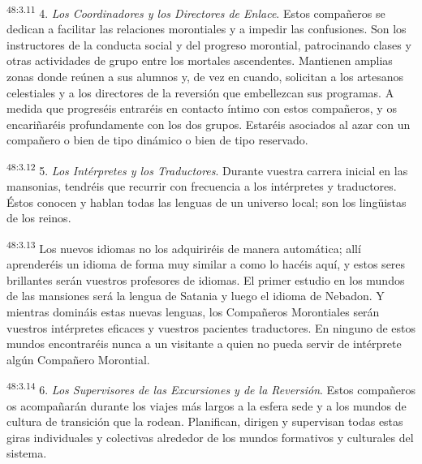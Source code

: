 \par
\textsuperscript{48:3.11} 4. \textit{Los Coordinadores y los Directores de Enlace}. Estos compañeros se dedican a facilitar las relaciones morontiales y a impedir las confusiones. Son los instructores de la conducta social y del progreso morontial, patrocinando clases y otras actividades de grupo entre los mortales ascendentes. Mantienen amplias zonas donde reúnen a sus alumnos y, de vez en cuando, solicitan a los artesanos celestiales y a los directores de la reversión que embellezcan sus programas. A medida que progreséis entraréis en contacto íntimo con estos compañeros, y os encariñaréis profundamente con los dos grupos. Estaréis asociados al azar con un compañero o bien de tipo dinámico o bien de tipo reservado.

\par
\textsuperscript{48:3.12} 5. \textit{Los Intérpretes y los Traductores}. Durante vuestra carrera inicial en las mansonias, tendréis que recurrir con frecuencia a los intérpretes y traductores. Éstos conocen y hablan todas las lenguas de un universo local; son los ling\"uistas de los reinos.

\par
\textsuperscript{48:3.13} Los nuevos idiomas no los adquiriréis de manera automática; allí aprenderéis un idioma de forma muy similar a como lo hacéis aquí, y estos seres brillantes serán vuestros profesores de idiomas. El primer estudio en los mundos de las mansiones será la lengua de Satania y luego el idioma de Nebadon. Y mientras domináis estas nuevas lenguas, los Compañeros Morontiales serán vuestros intérpretes eficaces y vuestros pacientes traductores. En ninguno de estos mundos encontraréis nunca a un visitante a quien no pueda servir de intérprete algún Compañero Morontial.

\par
\textsuperscript{48:3.14} 6. \textit{Los Supervisores de las Excursiones y de la Reversión}. Estos compañeros os acompañarán durante los viajes más largos a la esfera sede y a los mundos de cultura de transición que la rodean. Planifican, dirigen y supervisan todas estas giras individuales y colectivas alrededor de los mundos formativos y culturales del sistema.

